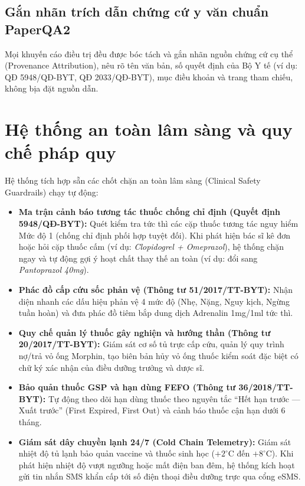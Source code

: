 \documentclass[12pt,a4paper]{article}
\begin{document}
\subsection{Gắn nhãn trích dẫn chứng cứ y văn chuẩn PaperQA2}
Mọi khuyến cáo điều trị đều được bóc tách và gắn nhãn nguồn chứng cứ cụ thể (Provenance Attribution), nêu rõ tên văn bản, số quyết định của Bộ Y tế (ví dụ: QĐ 5948/QĐ-BYT, QĐ 2033/QĐ-BYT), mục điều khoản và trang tham chiếu, không bịa đặt nguồn dẫn.

\section{Hệ thống an toàn lâm sàng và quy chế pháp quy}

Hệ thống tích hợp sẵn các chốt chặn an toàn lâm sàng (Clinical Safety Guardrails) chạy tự động:

\begin{itemize}[leftmargin=1.5em]
    \item \textbf{Ma trận cảnh báo tương tác thuốc chống chỉ định (Quyết định 5948/QĐ-BYT):} Quét kiểm tra tức thì các cặp thuốc tương tác nguy hiểm Mức độ 1 (chống chỉ định phối hợp tuyệt đối). Khi phát hiện bác sĩ kê đơn hoặc hỏi cặp thuốc cấm (ví dụ: \textit{Clopidogrel + Omeprazol}), hệ thống chặn ngay và tự động gợi ý hoạt chất thay thế an toàn (ví dụ: đổi sang \textit{Pantoprazol 40mg}).
    \item \textbf{Phác đồ cấp cứu sốc phản vệ (Thông tư 51/2017/TT-BYT):} Nhận diện nhanh các dấu hiệu phản vệ 4 mức độ (Nhẹ, Nặng, Nguy kịch, Ngừng tuần hoàn) và đưa phác đồ tiêm bắp dung dịch Adrenalin 1mg/1ml tức thì.
    \item \textbf{Quy chế quản lý thuốc gây nghiện và hướng thần (Thông tư 20/2017/TT-BYT):} Giám sát cơ số tủ trực cấp cứu, quản lý quy trình nợ/trả vỏ ống Morphin, tạo biên bản hủy vỏ ống thuốc kiểm soát đặc biệt có chữ ký xác nhận của điều dưỡng trưởng và dược sĩ.
    \item \textbf{Bảo quản thuốc GSP và hạn dùng FEFO (Thông tư 36/2018/TT-BYT):} Tự động theo dõi hạn dùng thuốc theo nguyên tắc ``Hết hạn trước --- Xuất trước'' (First Expired, First Out) và cảnh báo thuốc cận hạn dưới 6 tháng.
    \item \textbf{Giám sát dây chuyền lạnh 24/7 (Cold Chain Telemetry):} Giám sát nhiệt độ tủ lạnh bảo quản vaccine và thuốc sinh học ($+2^\circ\text{C}$ đến $+8^\circ\text{C}$). Khi phát hiện nhiệt độ vượt ngưỡng hoặc mất điện ban đêm, hệ thống kích hoạt gửi tin nhắn SMS khẩn cấp tới số điện thoại điều dưỡng trực qua cổng eSMS.
\end{itemize}
\end{document}
